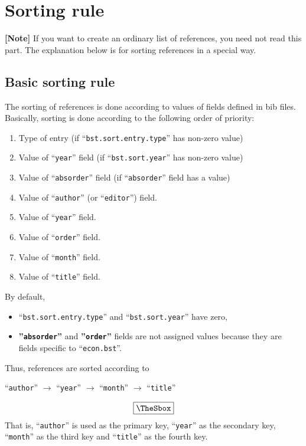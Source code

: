 \documentclass[10pt]{article}
\newenvironment{Frame}%
{\setlength{\fboxsep}{15pt}
\setlength{\mylength}{\linewidth}%
\addtolength{\mylength}{-2\fboxsep}%
\addtolength{\mylength}{-2\fboxrule}%
\Sbox
\minipage{\mylength}%
\setlength{\abovedisplayskip}{0pt}%
\setlength{\belowdisplayskip}{0pt}%
}%
{\endminipage\endSbox
\[\fbox{\TheSbox}\]}
\begin{document}
\section{Sorting rule}
\label{sec:sort_rule}

\noindent \textbf{[Note]} If you want to create an ordinary list of
references, you need not  read this part.  The explanation below is
for sorting references in a special way.

\subsection{Basic sorting rule}

The sorting of references is done according to values of fields defined
in bib files.  Basically, sorting is done according to the following
order of priority:
\begin{enumerate}
 \item Type of entry (if ``\texttt{bst.sort.entry.type}'' has non-zero value)
 \item Value of ``\texttt{year}'' field (if ``\texttt{bst.sort.year}'' has non-zero value)
 \item Value of ``\texttt{absorder}'' field (if ``\texttt{absorder}'' field has
       a value)
 \item Value of ``\texttt{author}'' (or ``\texttt{editor}'') field.
 \item Value of ``\texttt{year}'' field.
 \item Value of ``\texttt{order}'' field.
 \item Value of ``\texttt{month}'' field.
 \item Value of ``\texttt{title}'' field.
\end{enumerate}

By default, 
\begin{itemize}
 \item ``\texttt{bst.sort.entry.type}'' and ``\texttt{bst.sort.year}'' have
       zero,
 \item \textbf{''\texttt{absorder}''} and \textbf{''\texttt{order}''}
       fields are not assigned values because they are fields specific
       to ``\texttt{econ.bst}''.
\end{itemize}
Thus, references are sorted according to
\begin{Frame}
 \begin{center}
 ``\texttt{author}'' $\rightarrow$ ``\texttt{year}'' $\rightarrow$
 ``\texttt{month}'' $\rightarrow$  ``\texttt{title}'' 
\end{center}
\end{Frame}
That is, ``\texttt{author}'' is used as the primary key, ``\texttt{year}'' as
the secondary key, ``\texttt{month}'' as the third key and ``\texttt{title}'' as
the fourth key.
\end{document}
